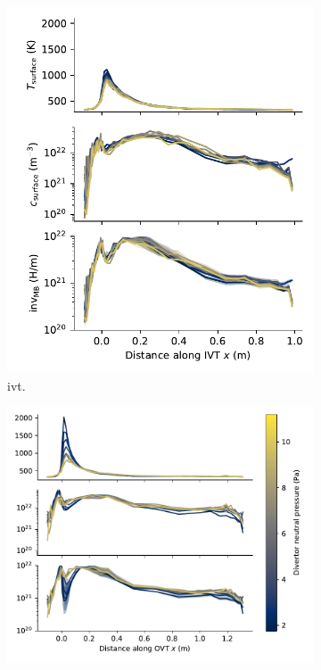 \begin{figure}[h!]
    \captionsetup[subfigure]{format=plain,singlelinecheck=true}  %
    \centering
    \begin{subfigure}{0.40\linewidth}
        \includegraphics[width=\linewidth]{Figures/Chapter4/ITER/inventory_along_inner_divertor.pdf}
        \caption{\gls{ivt}.}
    \end{subfigure}%
    \begin{subfigure}{0.58\linewidth}
        \includegraphics[width=\linewidth]{Figures/Chapter4/ITER/inventory_along_outer_divertor.pdf}

\end{subfigure}
\end{figure}
